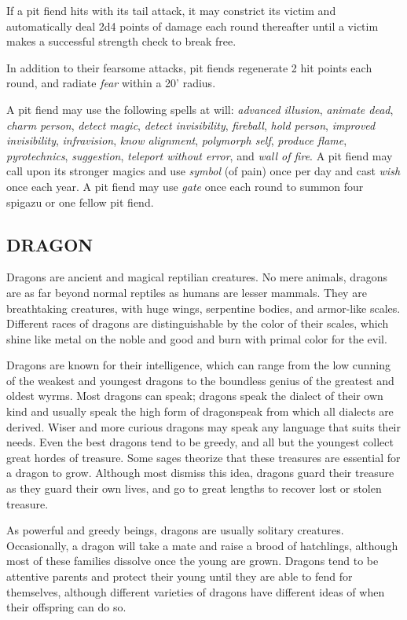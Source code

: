 \begin{multicols}{2}
If a pit fiend hits with its tail attack, it may constrict its victim and automatically deal 2d4 points of damage each round thereafter until a victim makes a successful strength check to break free.

In addition to their fearsome attacks, pit fiends regenerate 2 hit points each round, and radiate \textit{fear}  within a 20' radius.

A pit fiend may use the following spells at will: \textit{advanced illusion}, \textit{animate dead}, \textit{charm person}, \textit{detect magic}, \textit{detect invisibility}, \textit{fireball}, \textit{hold person}, \textit{improved invisibility}, \textit{infravision}, \textit{know alignment}, \textit{polymorph self}, \textit{produce flame}, \textit{pyrotechnics}, \textit{suggestion}, \textit{teleport without error}, and \textit{wall of fire}. A pit fiend may call upon its stronger magics and use \textit{symbol} (of pain) once per day and cast \textit{wish} once each year. A pit fiend may use \textit{gate} once each round to summon four spigazu or one fellow pit fiend.

\subsection{DRAGON}

Dragons are ancient and magical reptilian creatures. No mere animals, dragons are as far beyond normal reptiles as humans are lesser mammals. They are breathtaking creatures, with huge wings, serpentine bodies, and armor-like scales. Different races of dragons are distinguishable by the color of their scales, which shine like metal on the noble and good and burn with primal color for the evil.

Dragons are known for their intelligence, which can range from the low cunning of the weakest and youngest dragons to the boundless genius of the greatest and oldest wyrms. Most dragons can speak; dragons speak the dialect of their own kind and usually speak the high form of dragonspeak from which all dialects are derived. Wiser and more curious dragons may speak any language that suits their needs. Even the best dragons tend to be greedy, and all but the youngest collect great hordes of treasure. Some sages theorize that these treasures are essential for a dragon to grow. Although most dismiss this idea, dragons guard their treasure as they guard their own lives, and go to great lengths to recover lost or stolen treasure.

As powerful and greedy beings, dragons are usually solitary creatures. Occasionally, a dragon will take a mate and raise a brood of hatchlings, although most of these families dissolve once the young are grown. Dragons tend to be attentive parents and protect their young until they are able to fend for themselves, although different varieties of dragons have different ideas of when their offspring can do so.


\end{multicols}
